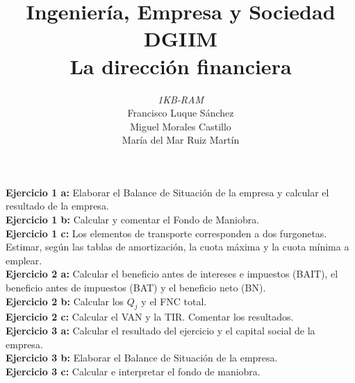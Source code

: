 \documentclass[11pt]{article}
\theoremstyle{plain}
\theoremstyle{definition}
\begin{document}
\title{Ingeniería, Empresa y Sociedad \\
  DGIIM \\
  \large La dirección financiera}
\author{\textit{1KB-RAM}\\
  Francisco Luque Sánchez\\
  Miguel Morales Castillo\\
  María del Mar Ruiz Martín}

\maketitle

\textbf{Ejercicio 1 a:} Elaborar el Balance de Situación de la empresa
y calcular el resultado de la empresa.\\

\textbf{Ejercicio 1 b:} Calcular y comentar el Fondo de Maniobra.\\

\textbf{Ejercicio 1 c:} Los elementos de transporte corresponden a dos
furgonetas. Estimar, según las tablas de amortización, la cuota máxima
y la cuota mínima a emplear.\\

\textbf{Ejercicio 2 a:} Calcular el beneficio antes de intereses e
impuestos (BAIT), el beneficio antes de impuestos (BAT) y el beneficio
neto (BN).\\

\textbf{Ejercicio 2 b:} Calcular los $Q_j$ y el FNC total.\\

\textbf{Ejercicio 2 c:} Calcular el VAN y la TIR. Comentar los
resultados.\\

\textbf{Ejercicio 3 a:} Calcular el resultado del ejercicio y el
capital social de la empresa.\\

\textbf{Ejercicio 3 b:} Elaborar el Balance de Situación de la
empresa.\\

\textbf{Ejercicio 3 c:} Calcular e interpretar el fondo de maniobra.\\
\end{document}
